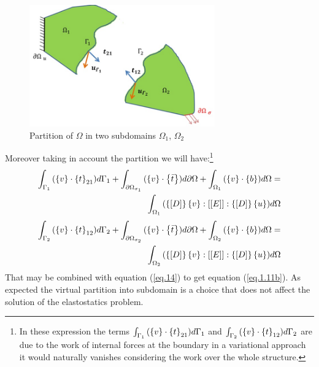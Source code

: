  \begin{figure}[ht]
 \centering
 \includegraphics[width=8cm]{images/Ch1/free_body}
 \caption{Partition of $\Omega$ in two subdomains $\Omega_1$, $\Omega_2$} 
 \label{fig.1.5}
 \end{figure}
 
 Moreover taking in account the partition we will have:\footnote{In these expression the terms $\int_{\Gamma_1}{(\left\lbrace{v}\right \rbrace \cdot \left\lbrace{t}\right \rbrace_{21} )d\Gamma_1}$ and $\int_{\Gamma_2}{(\left\lbrace{v}\right \rbrace \cdot \left\lbrace{t}\right \rbrace_{12} )d\Gamma_2}$ are due to the work of internal forces at the boundary in a variational approach it would naturally vanishes considering the work over the whole structure.}
 \begin{equation}
 \begin{aligned}
 \label{eq.15}
 \int_{\Gamma_1}{(\left\lbrace{v}\right \rbrace \cdot \left\lbrace{t}\right \rbrace_{21} )d\Gamma_1}+\int_{\partial \Omega_{\sigma_1}}{(\left\lbrace{v}\right \rbrace \cdot \left\lbrace{\bar{t}}\right \rbrace )d\partial \Omega}+\int_{\Omega_1}{(\left\lbrace{v}\right \rbrace \cdot \left\lbrace{b}\right \rbrace) d\Omega} =\\\int_{\Omega_1}{(\left\lbrace{\ensuremath\left[{D}\right]}\right \rbrace \left\lbrace{v}\right \rbrace :\left[{\left[{E}\right]}\right]:\left\lbrace{\ensuremath\left[{D}\right]}\right \rbrace \left\lbrace{u}\right \rbrace  )d\Omega}
 \end{aligned}
 \end{equation}
 \begin{equation}
 \begin{split}
 \label{eq.16}
 \int_{\Gamma_2}{(\left\lbrace{v}\right \rbrace \cdot \left\lbrace{t}\right \rbrace_{12} )d\Gamma_2}+\int_{\partial \Omega_{\sigma_2}}{(\left\lbrace{v}\right \rbrace \cdot \left\lbrace{\bar{t}}\right \rbrace )d\partial \Omega}+\int_{ \Omega_2}{(\left\lbrace{v}\right \rbrace \cdot \left\lbrace{b}\right \rbrace) d\Omega}=\\\int_{ \Omega_2}{(\left\lbrace{\ensuremath\left[{D}\right]}\right \rbrace \left\lbrace{v}\right \rbrace :\left[{\left[{E}\right]}\right]:\left\lbrace{\ensuremath\left[{D}\right]}\right \rbrace \left\lbrace{u}\right \rbrace  )d\Omega}
 \end{split}
 \end{equation}
 That may be combined with equation (\ref{eq.14}) to get equation (\ref{eq.1.11b}).
 As expected the virtual partition into subdomain is a choice that does not affect the solution of the elastostatics problem.   
 \\

